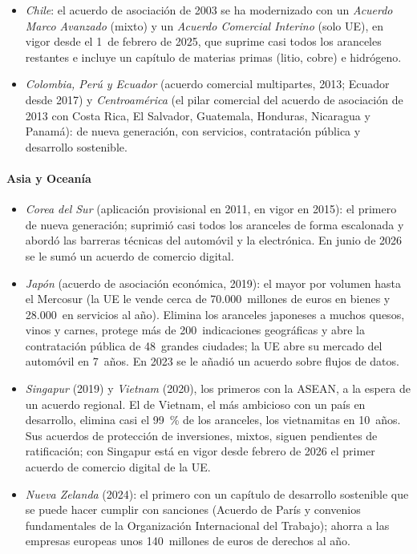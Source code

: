 \documentclass[11pt]{article}
\begin{document}
\begin{itemize}
\item \emph{Chile}: el acuerdo de asociación de 2003 se ha modernizado con un \emph{Acuerdo Marco Avanzado} (mixto) y un \emph{Acuerdo Comercial Interino} (solo UE), en vigor desde el 1~de febrero de 2025, que suprime casi todos los aranceles restantes e incluye un capítulo de materias primas (litio, cobre) e hidrógeno\nocite{CE2026Chile}.
\item \emph{Colombia, Perú y Ecuador} (acuerdo comercial multipartes, 2013; Ecuador desde 2017) y \emph{Centroamérica} (el pilar comercial del acuerdo de asociación de 2013 con Costa Rica, El Salvador, Guatemala, Honduras, Nicaragua y Panamá): de nueva generación, con servicios, contratación pública y desarrollo sostenible.
\end{itemize}

\paragraph{Asia y Oceanía}

\begin{itemize}
\item \emph{Corea del Sur} (aplicación provisional en 2011, en vigor en 2015): el primero de nueva generación; suprimió casi todos los aranceles de forma escalonada y abordó las barreras técnicas del automóvil y la electrónica. En junio de 2026 se le sumó un acuerdo de comercio digital\nocite{CE2026Corea}.
\item \emph{Japón} (acuerdo de asociación económica, 2019): el mayor por volumen hasta el Mercosur (la UE le vende cerca de 70.000~millones de euros en bienes y 28.000~en servicios al año). Elimina los aranceles japoneses a muchos quesos, vinos y carnes, protege más de 200~indicaciones geográficas y abre la contratación pública de 48~grandes ciudades; la UE abre su mercado del automóvil en 7~años. En 2023 se le añadió un acuerdo sobre flujos de datos\nocite{CE2026Japon}.
\item \emph{Singapur} (2019) y \emph{Vietnam} (2020), los primeros con la ASEAN, a la espera de un acuerdo regional. El de Vietnam, el más ambicioso con un país en desarrollo, elimina casi el 99~\% de los aranceles, los vietnamitas en 10~años. Sus acuerdos de protección de inversiones, mixtos, siguen pendientes de ratificación; con Singapur está en vigor desde febrero de 2026 el primer acuerdo de comercio digital de la UE\nocite{CE2026Singapur,CE2026Vietnam}.
\item \emph{Nueva Zelanda} (2024): el primero con un capítulo de desarrollo sostenible que se puede hacer cumplir con sanciones (Acuerdo de París y convenios fundamentales de la Organización Internacional del Trabajo); ahorra a las empresas europeas unos 140~millones de euros de derechos al año\nocite{CE2026NuevaZelanda}.
\end{itemize}
\end{document}
